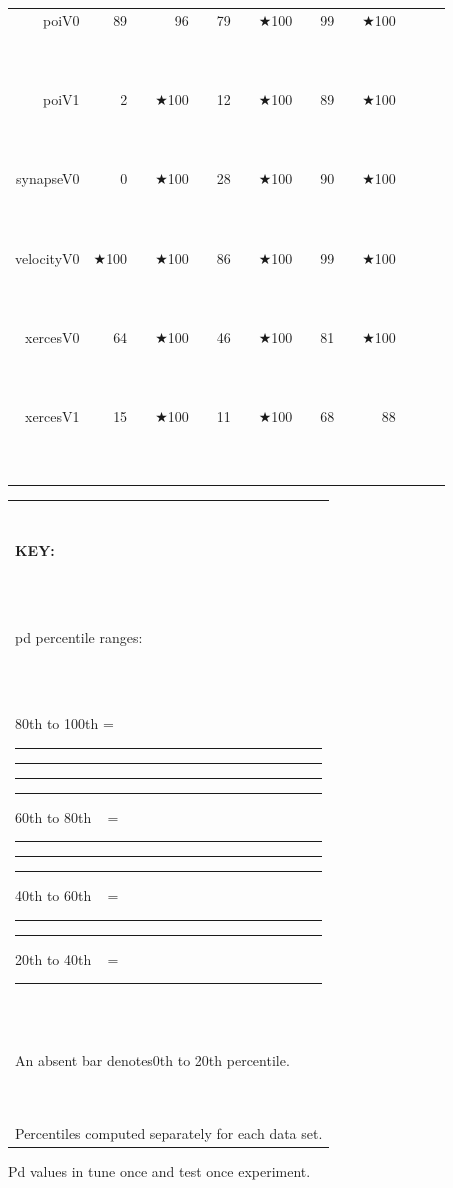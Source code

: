 \documentclass{acm_proc_article-sp}
\newcommand{\crule}[3][darkgray]{\textcolor{#1}{\rule{#2}{#3}}}
\newcommand{\rone}{\crule{1mm}{1.95mm}}
\newcommand{\rtwo}{\crule{1mm}{1.95mm}\hspace{0.3pt}\crule{1mm}{1.95mm}}
\newcommand{\rthree}{\crule{1mm}{1.95mm}\hspace{0.3pt}\crule{1mm}{1.95mm}\hspace{0.3pt}\crule{1mm}{1.95mm}}
\newcommand{\rfour}{\crule{1mm}{1.95mm}\hspace{0.3pt}\crule{1mm}{1.95mm}\hspace{0.3pt}\crule{1mm}{1.95mm}\hspace{0.3pt}\crule{1mm}{1.95mm}}
\begin{document}
\begin{figure*}
\begin{minipage}{0.81\linewidth}
\begin{tabular}{r@{~}|r@{~}l@{~}|r@{~}l@{~}|r@{~}l|r@{~}@{~}l|r@{~}l@{~}|r@{~}l@{~}|r@{~}l}
poiV0 & 89 & {\rtwo} & 96 & {\rfour} & 79 &         & $\bigstar$100 & {\rfour} & 99 & {\rfour} & $\bigstar$100 & {\rfour}\\
poiV1 & 2 &         & $\bigstar$100 & {\rfour} & 12 &         & $\bigstar$100 & {\rfour} & 89 & {\rfour} & $\bigstar$100 & {\rfour}\\
synapseV0 & 0 &         & $\bigstar$100 & {\rfour} & 28 & {\rone} & $\bigstar$100 & {\rfour} & 90 & {\rfour} & $\bigstar$100 & {\rfour}\\
velocityV0 & $\bigstar$100 & {\rfour} & $\bigstar$100 & {\rfour} & 86 &         & $\bigstar$100 & {\rfour} & 99 & {\rfour} & $\bigstar$100 & {\rfour}\\
xercesV0 & 64 & {\rone} & $\bigstar$100 & {\rfour} & 46 &         & $\bigstar$100 & {\rfour} & 81 & {\rthree} & $\bigstar$100 & {\rfour}\\
xercesV1 & 15 &         & $\bigstar$100 & {\rfour} & 11 &         & $\bigstar$100 & {\rfour} & 68 & {\rthree} & 88 & {\rfour}\\

\end{tabular}
\end{minipage}\begin{minipage}{.15\linewidth}
\begin{tabular}{|p{\linewidth}|}\hline

~\\

{\bf KEY:}

~\\

pd percentile ranges:

~\\

80th to 100th = {\rfour}

60th to 80th ~ = {\rthree}

40th to 60th  ~ = {\rtwo}

20th to 40th  ~ = {\rone}

~\\

An absent bar denotes\newline 0th to 20th percentile.

~\\

Percentiles computed  separately
for each data set.\\\hline
\end{tabular}
\end{minipage}
\caption{Pd values in tune once and test once experiment. 
}\label{fig:nonc}
\end{figure*}
\end{document}
